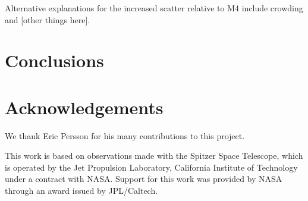 \documentclass[a4paper,fleqn,usenatbib]{mnras}
\begin{document}
Alternative explanations for the increased scatter relative to M4 include crowding and [other things here].


\section{Conclusions}
\label{sec:conclusions}


\section*{Acknowledgements}
\label{sec:acknowledgements}

We thank Eric Persson for his many contributions to this project.

This work is based on observations made with the Spitzer Space Telescope, which is operated by the Jet Propulsion Laboratory, California Institute of Technology under a contract with NASA. Support for this work was provided by NASA through an award issued by JPL/Caltech.












\clearpage
\newpage

\appendix
\end{document}
